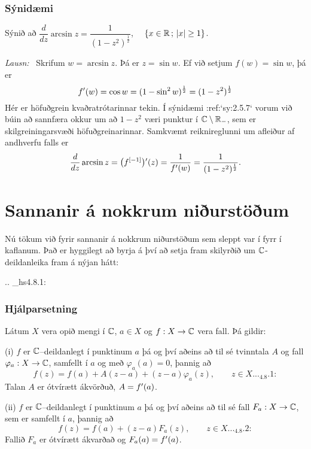 \subsubsection{Sýnidæmi} Sýnið að  $\dfrac d{dz}\arcsin z= \dfrac 1{(1-z^2)^{\frac
12}}$, \ \ $\{x\in {\mathbb R} \,;\, |x|\geq 1 \}$.


\smallskip\noindent 
{\it Lausn:} \  Skrifum $w=\arcsin z$.  Þá er $z=\sin w$.  Ef við
setjum $f(w)=\sin w$, þá er 
$$
f{\sp{\prime}}(w)=\cos w=(1-\sin ^2 w)^{\frac 12}
=(1-z^2)^{\frac 12}
$$
Hér er höfuðgrein kvaðratrótarinnar tekin.  Í sýnidæmi :ref:`sy:2.5.7`
vorum við búin að sannfæra okkur um að $1-z^2$ væri punktur í ${\mathbb C}\setminus
{\mathbb R}_-$, sem er skilgreiningarsvæði höfuðgreinarinnar.  Samkvæmt
reiknireglunni um afleiður af andhverfu falls er
$$
\dfrac d{dz} \arcsin z=\big(f^{[-1]}\big){\sp{\prime}} (z)=
\dfrac 1{f{\sp{\prime}}(w)} =\dfrac 1{(1-z^2)^{\frac 12}}.
$$




\section{Sannanir á nokkrum niðurstöðum}



\noindent
Nú tökum við fyrir sannanir á nokkrum niðurstöðum sem sleppt var í
fyrr í kaflanum.  Það er hyggilegt að byrja á því að setja fram skilyrðið um
${\mathbb C}$-deildanleika fram á nýjan hátt:




.. _hs4.8.1:

\subsubsection{Hjálparsetning}  Látum $X$ vera opið mengi 
í ${\mathbb C}$, $a\in X$ og $f:X\to {\mathbb C}$ vera fall.  Þá
gildir:

\smallskip
(i) $f$ er ${\mathbb C}$--deildanlegt í punktinum $a$ þá og því aðeins
að til sé tvinntala $A$ og fall $\varphi_a:X\to {\mathbb C}$,  samfellt í
$a$ og með $\varphi_a(a)=0$,  þannig að
 \begin{equation}f(z)=f(a)+A(z-a)+(z-a)\varphi_a(z), \qquad z\in X.


.. _4.8.1:

 \end{equation}
Talan $A$ er ótvírætt ákvörðuð, $A=f{\sp{\prime}}(a)$.

\smallskip
(ii) $f$ er ${\mathbb C}$--deildanlegt í punktinum $a$ þá og því aðeins
að til sé fall $F_a:X\to {\mathbb C}$, sem er samfellt í $a$, þannig að
 \begin{equation*}f(z)=f(a)+(z-a)F_a(z), \qquad z\in X.


.. _4.8.2:

 \end{equation*}
Fallið $F_a$ er ótvírætt ákvarðað og  $F_a(a)=f{\sp{\prime}}(a)$.



